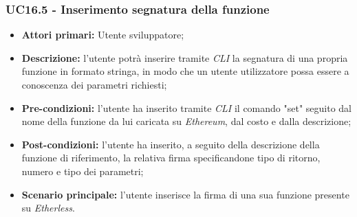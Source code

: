 \subsubsection{UC16.5 - Inserimento segnatura della funzione}
\begin{itemize}
	\item \textbf{Attori primari:} Utente sviluppatore;
	\item \textbf{Descrizione:} l'utente potrà inserire tramite \textit{CLI\glo} la segnatura di una propria funzione in formato stringa, in modo che un utente utilizzatore possa essere a conoscenza dei parametri richiesti; 
	\item \textbf{Pre-condizioni:} l'utente ha inserito tramite \textit{CLI\glo} il comando "set" seguito dal nome della funzione da lui caricata su \textit{Ethereum\glos}, dal costo e dalla descrizione;
	\item \textbf{Post-condizioni:} l'utente ha inserito, a seguito della descrizione della funzione di riferimento, la relativa firma specificandone tipo di ritorno, numero e tipo dei parametri;
	\item \textbf{Scenario principale:} l'utente inserisce la firma di una sua funzione presente su \textit{Etherless}.
\end{itemize}